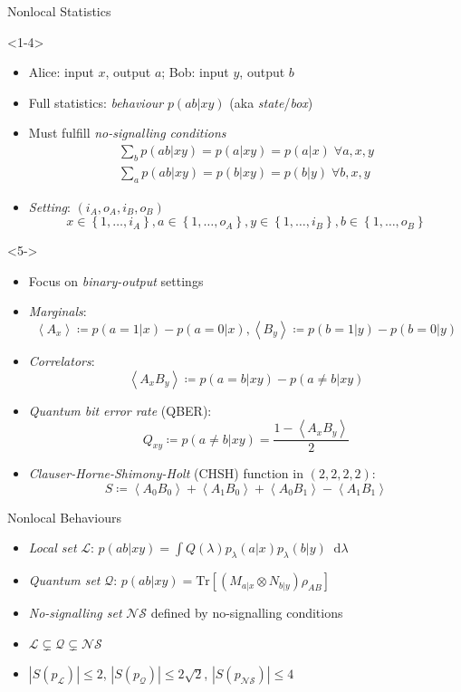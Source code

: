 \documentclass[xcolor=dvipsnames]{beamer}
\newcommand{\?}{\mathrel{?}} %
\newcommand{\abs}[1]{\left\lvert#1\right\rvert} %
\newcommand{\dif}{\mathop{}\!\mathrm{d}} %
\newcommand{\dintv}[2]{\left\{#1,\ldots,#2\right\}}
\newcommand{\Tr}{\mathrm{Tr}} %
\newcommand{\angleb}[1]{\left\langle #1 \right\rangle} %
\newcommand{\Ls}{\mathcal{L}}
\newcommand{\Qs}{\mathcal{Q}}
\newcommand{\NSs}{\mathcal{NS}}
\begin{document}
\begin{frame}{Nonlocal Statistics}
  \begin{onlyenv}<1-4>
  \begin{itemize}[<+->]
    \item Alice: input \(x\), output \(a\); Bob: input \(y\), output \(b\)
    \item Full statistics: \emph{behaviour} \(p(ab|xy)\) (aka \emph{state}/\emph{box})
    \item Must fulfill \emph{no-signalling conditions}
      \begin{gather*}
        \sum_b p(ab|xy) = p(a|xy) = p(a|x)\;\forall a,x,y \\
        \sum_a p(ab|xy) = p(b|xy) = p(b|y)\;\forall b,x,y
      \end{gather*}
    \item \emph{Setting}: \((i_A, o_A, i_B, o_B)\)
    \[ x \in \dintv{1}{i_A}, a \in \dintv{1}{o_A}, y \in \dintv{1}{i_B}, b \in \dintv{1}{o_B} \]
  \end{itemize}
  \end{onlyenv}
  \begin{onlyenv}<5->
  \begin{itemize}[<+->]
    \item Focus on \emph{binary-output} settings
    \item \emph{Marginals}:
      \[ \angleb{A_x} \coloneqq p(a=1|x) - p(a=0|x), \angleb{B_y} \coloneqq p(b=1|y) - p(b=0|y) \]
    \item \emph{Correlators}:
      \[ \angleb{A_x B_y} \coloneqq p(a=b|xy) - p(a\neq b|xy) \]
    \item \emph{Quantum bit error rate} (QBER):
      \[ Q_{xy} \coloneqq p(a \neq b|xy) = \frac{1-\angleb{A_x B_y}}{2} \]
    \item \emph{Clauser-Horne-Shimony-Holt} (CHSH) function in \((2,2,2,2)\):
      \[ S \coloneqq \angleb{A_0 B_0} + \angleb{A_1 B_0} + \angleb{A_0 B_1} - \angleb{A_1 B_1} \]
  \end{itemize}
  \end{onlyenv}
\end{frame}

\begin{frame}{Nonlocal Behaviours}
  \begin{itemize}[<+->]
    \item \emph{Local set} \(\Ls\): \(p(ab|xy) = \int Q(\lambda) p_{\lambda}(a|x)p_{\lambda}(b|y) \dif{\lambda} \)
    \item \emph{Quantum set} \(\Qs\): \(p(ab|xy) = \Tr\left[ \left(M_{a|x} \otimes N_{b|y}\right) \rho_{AB} \right]\)
    \item \emph{No-signalling set} \(\NSs\) defined by no-signalling conditions
    \item \(\Ls \subsetneq \Qs \subsetneq \NSs\)
    \item \(\abs{S(p_{\Ls})} \leq 2\), \(\abs{S(p_{\Qs})} \leq 2\sqrt{2}\), \(\abs{S(p_{\NSs})} \leq 4\)
  \end{itemize}
\end{frame}
\end{document}
